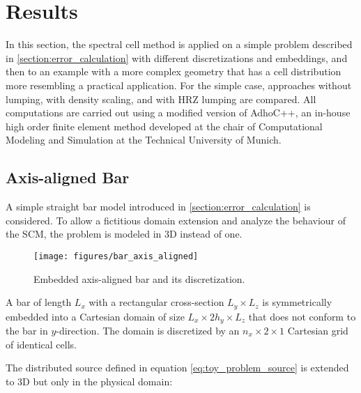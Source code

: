%
\section{Results}
\label{section:results}
%

In this section, the spectral cell method is applied on a simple problem described in \ref{section:error_calculation} with different discretizations and embeddings, and then to an example with a more complex geometry that has a cell distribution more resembling a practical application. For the simple case, approaches without lumping, with density scaling, and with HRZ lumping are compared. All computations are carried out using a modified version of AdhoC++, an in-house high order finite element method developed at the chair of Computational Modeling and Simulation at the Technical University of Munich.

%
\subsection{Axis-aligned Bar}
\label{section:axis_aligned_bar}
%

A simple straight bar model introduced in \ref{section:error_calculation} is considered. To allow a fictitious domain extension and analyze the behaviour of the SCM, the problem is modeled in 3D instead of one.

\begin{figure}[!h]
	\centering
	\texttt{[image: figures/bar\_axis\_aligned]}
	\caption{Embedded axis-aligned bar and its discretization.}
	\label{fig:bar_axis_aligned}
\end{figure}

A bar of length $L_x$ with a rectangular cross-section $L_y \times L_z$ is symmetrically embedded into a Cartesian domain of size $L_x \times 2h_y \times L_z$ that does not conform to the bar in $y$-direction. The domain is discretized by an $n_x \times 2 \times 1$ Cartesian grid of identical cells.

The distributed source defined in equation \ref{eq:toy_problem_source} is extended to 3D but only in the physical domain:

